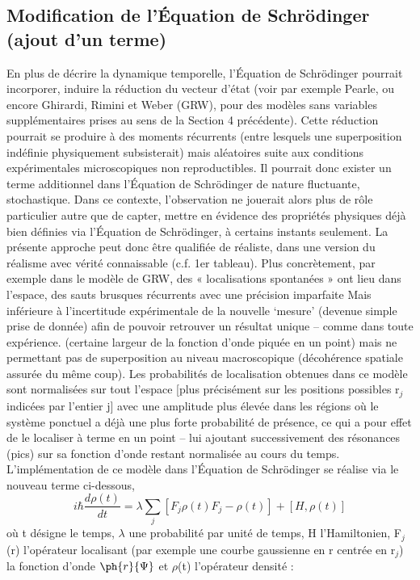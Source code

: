 \subsection{Modification de l’Équation de Schrödinger (ajout d’un terme)}
En plus de décrire la dynamique temporelle, l’Équation de Schrödinger pourrait incorporer,
induire la réduction du vecteur d’état (voir par exemple Pearle, ou encore Ghirardi, Rimini
et Weber (GRW), pour des modèles sans variables supplémentaires prises au sens de la
Section 4 précédente). Cette réduction pourrait se produire à des moments récurrents (entre
lesquels une superposition indéfinie physiquement subsisterait) mais aléatoires suite aux
conditions expérimentales microscopiques non reproductibles. Il pourrait donc exister un
terme additionnel dans l’Équation de Schrödinger de nature fluctuante, stochastique. Dans
ce contexte, l’observation ne jouerait alors plus de rôle particulier autre que de capter,
mettre en évidence des propriétés physiques déjà bien définies via l’Équation de
Schrödinger, à certains instants seulement. La présente approche peut donc être qualifiée de
réaliste, dans une version du réalisme avec vérité connaissable (c.f. 1er tableau). Plus
concrètement, par exemple dans le modèle de GRW, des « localisations spontanées » ont
lieu dans l’espace, des sauts brusques récurrents avec une précision imparfaite
 {\footnotesize  Mais inférieure à l’incertitude expérimentale de la nouvelle ‘mesure’ (devenue simple prise de donnée) afin de
pouvoir retrouver un résultat unique – comme dans toute expérience.} (certaine
largeur de la fonction d’onde piquée en un point) mais ne permettant pas de superposition au
niveau macroscopique (décohérence spatiale assurée du même coup). Les probabilités de
localisation obtenues dans ce modèle sont normalisées sur tout l’espace [plus précisément
sur les positions possibles r$_j$ indicées par l’entier j] avec une amplitude plus élevée dans les
régions où le système ponctuel a déjà une plus forte probabilité de présence, ce qui a pour
effet de le localiser à terme en un point – lui ajoutant successivement des résonances (pics)
sur sa fonction d’onde restant normalisée au cours du temps. L’implémentation de ce
modèle dans l’Équation de Schrödinger se réalise via le nouveau terme ci-dessous,
\[
i\hbar\frac{d\rho(t)}{dt} = \lambda\sum_j[F_j\rho(t)F_j-\rho(t)]+[H,\rho(t)]
\]
où t désigne le temps, $\lambda$ une probabilité par unité de temps, H l’Hamiltonien, F$_j$(r)
l’opérateur localisant (par exemple une courbe gaussienne en r centrée en r$_j$) la fonction
d’onde $\ph{r}{\Psi}$ et $\rho$(t) l’opérateur densité :
